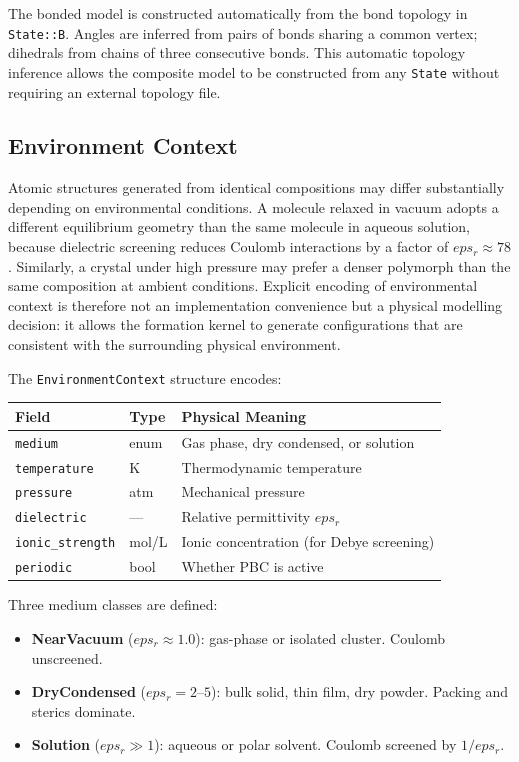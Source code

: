 \documentclass[11pt,twoside]{article}
\def\varepsilon{eps}%
\newcommand{\type}[1]{\texttt{#1}}
\newcommand{\field}[1]{\texttt{#1}}
\begin{document}
The bonded model is constructed automatically from the bond topology in \field{State::B}. Angles are inferred from pairs of bonds sharing a common vertex; dihedrals from chains of three consecutive bonds. This automatic topology inference allows the composite model to be constructed from any \type{State} without requiring an external topology file.

\subsection{Environment Context}
\label{sec:environment}

Atomic structures generated from identical compositions may differ substantially depending on environmental conditions. A molecule relaxed in vacuum adopts a different equilibrium geometry than the same molecule in aqueous solution, because dielectric screening reduces Coulomb interactions by a factor of $\varepsilon_r \approx 78$. Similarly, a crystal under high pressure may prefer a denser polymorph than the same composition at ambient conditions. Explicit encoding of environmental context is therefore not an implementation convenience but a physical modelling decision: it allows the formation kernel to generate configurations that are consistent with the surrounding physical environment.

The \type{EnvironmentContext} structure encodes:

\begin{center}
\begin{tabular}{lll}
\toprule
\textbf{Field} & \textbf{Type} & \textbf{Physical Meaning} \\
\midrule
\texttt{medium}        & enum  & Gas phase, dry condensed, or solution \\
\texttt{temperature}   & K     & Thermodynamic temperature \\
\texttt{pressure}      & atm   & Mechanical pressure \\
\texttt{dielectric}    & ---   & Relative permittivity $\varepsilon_r$ \\
\texttt{ionic\_strength} & mol/L & Ionic concentration (for Debye screening) \\
\texttt{periodic}      & bool  & Whether PBC is active \\
\bottomrule
\end{tabular}
\end{center}

Three medium classes are defined:

\begin{itemize}
  \item \textbf{NearVacuum} ($\varepsilon_r \approx 1.0$): gas-phase or isolated cluster. Coulomb unscreened.
  \item \textbf{DryCondensed} ($\varepsilon_r = 2$--$5$): bulk solid, thin film, dry powder. Packing and sterics dominate.
  \item \textbf{Solution} ($\varepsilon_r \gg 1$): aqueous or polar solvent. Coulomb screened by $1/\varepsilon_r$.
\end{itemize}
\end{document}
